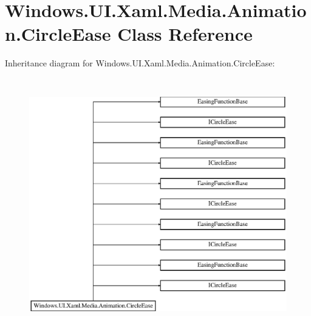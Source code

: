 \hypertarget{class_windows_1_1_u_i_1_1_xaml_1_1_media_1_1_animation_1_1_circle_ease}{}\section{Windows.\+U\+I.\+Xaml.\+Media.\+Animation.\+Circle\+Ease Class Reference}
\label{class_windows_1_1_u_i_1_1_xaml_1_1_media_1_1_animation_1_1_circle_ease}
Inheritance diagram for Windows.\+U\+I.\+Xaml.\+Media.\+Animation.\+Circle\+Ease\+:\begin{figure}[H]
\begin{center}
\leavevmode
\includegraphics[height=10.960854cm]{class_windows_1_1_u_i_1_1_xaml_1_1_media_1_1_animation_1_1_circle_ease}
\end{center}
\end{figure}
